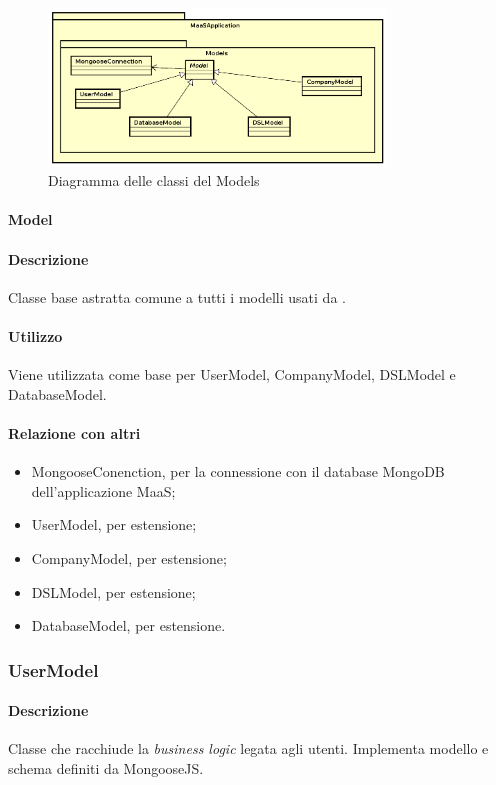 \begin{figure}[H]
\centering
\includegraphics[width=0.8\textwidth]{res/sections/backend/models.png}
\caption{Diagramma delle classi del  Models}
\end{figure}

\paragraph{Model}
\paragraph*{Descrizione}
Classe base astratta comune a tutti i modelli usati da .

\paragraph*{Utilizzo}
Viene utilizzata come base per UserModel, CompanyModel, DSLModel e DatabaseModel.

\paragraph*{Relazione con altri }
\begin{itemize}
\item MongooseConenction, per la connessione con il database MongoDB dell'applicazione MaaS;
\item UserModel, per estensione;
\item CompanyModel, per estensione;
\item DSLModel, per estensione;
\item DatabaseModel, per estensione.
\end{itemize}

\subsubsection{UserModel}
\paragraph*{Descrizione}
Classe che racchiude la \textit{business logic} legata agli utenti. Implementa modello e schema definiti da MongooseJS.


